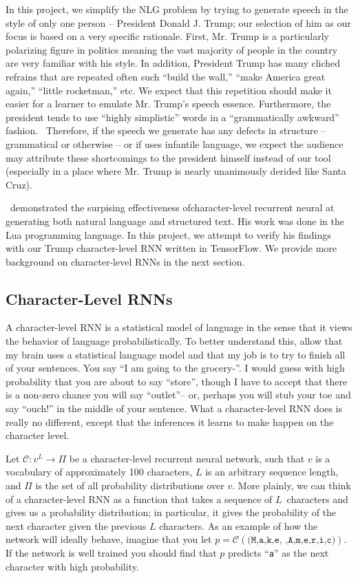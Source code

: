 \documentclass{article}
\begin{document}
In this project, we simplify the NLG problem by trying to generate speech in the style of only one person -- President Donald J. Trump; our selection of him as our focus is based on a very specific rationale.  First, Mr. Trump is a particularly polarizing figure in politics meaning the vast majority of people in the country are very familiar with his style.  In addition, President Trump has many cliched refrains that are repeated often such ``build the wall,'' ``make America great again,'' ``little rocketman,'' etc. We expect that this repetition should make it easier for a learner to emulate Mr. Trump's speech essence.  Furthermore, the president tends to use ``highly simplistic'' words in a ``grammatically awkward'' fashion.~\cite{goldhill2017}  Therefore, if the speech we generate has any defects in structure -- grammatical or otherwise -- or if uses infantile language, we expect the audience may attribute these shortcomings to the president himself instead of our tool (especially in a place where Mr. Trump is nearly unanimously derided like Santa Cruz).

\cite{karapathy2015}~demonstrated the surpising effectiveness ofcharacter-level recurrent neural at generating both natural language and structured text. His work was done in the Lua programming language.  In this project, we attempt to verify his findings with our Trump character-level RNN written in TensorFlow.  We provide more background on character-level RNNs in the next section.


\subsection{Character-Level RNNs}

A character-level RNN is a statistical model of language in the sense that it views the behavior of language probabilistically. To better understand this, allow that my brain uses a statistical language model and that my job is to try to finish all of your sentences. You say ``I am going to the grocery-''. I would guess with high probability that you are about to say ``store'', though I have to accept that there is a non-zero chance you will say ``outlet''-- or, perhaps you will stub your toe and say ``ouch!'' in the middle of your sentence. What a character-level RNN does is really no different, except that the inferences it learns to make happen on the character level.

Let $\mathcal{C} : v^L \rightarrow \Pi$ be a character-level recurrent neural network, such that $v$ is a vocabulary of approximately 100 characters, $L$ is an arbitrary sequence length, and $\Pi$ is the set of all probability distributions over $v$. More plainly, we can think of a character-level RNN as a function that takes a sequence of $L$~characters and gives us a probability distribution; in particular, it gives the probability of the next character given the previous $L$ characters. As an example of how the network will ideally behave, imagine that you let $p = \mathcal{C}(\texttt{(M,a,k,e, ,A,m,e,r,i,c)})$. If the network is well trained you should find that $p$ predicts ``\texttt{a}'' as the next character with high probability.
\end{document}
